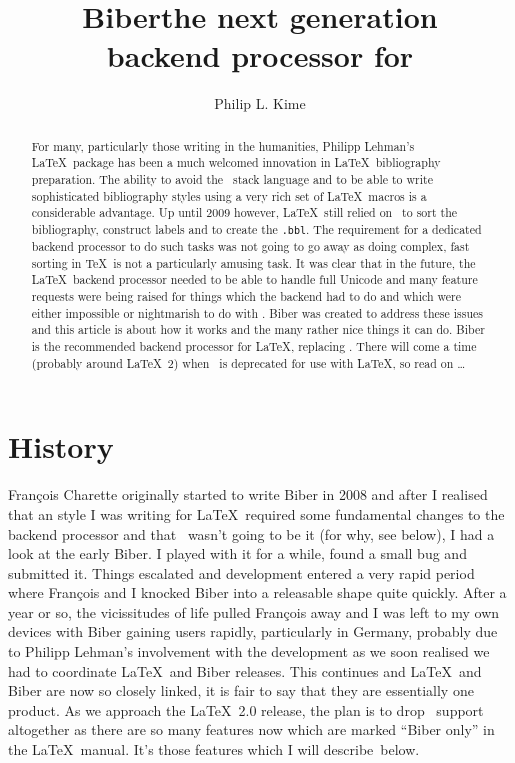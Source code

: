 \documentclass[final]{ltugboat}
\title{Biber\Dash{}the next generation \\backend processor for \BibLaTeX}
\author{Philip L. Kime}
\def\BibLaTeX{\Bib\LaTeX}
\begin{document}
\maketitle
\begin{abstract}
 For many, particularly those
 writing in the humanities, 
 Philipp Lehman's \BibLaTeX\ package has been a much welcomed
 innovation in \LaTeX\ bibliography
 preparation. The ability to avoid the \BibTeX\ stack language and to be
 able to write sophisticated bibliography styles using a very rich set of
 \LaTeX\ macros is a considerable advantage. Up until 2009 however,
 \BibLaTeX\ still relied on \BibTeX\ to sort the bibliography, construct labels and to
 create the \verb|.bbl|. The requirement for a dedicated backend processor
 to do such tasks was not going to go away as doing complex, fast sorting
 in \TeX\ is not a particularly amusing task. It was clear that in the
 future, the \BibLaTeX\ backend processor needed
 to be able to handle full Unicode and many feature requests were being
 raised for things which the backend had to do and which were
 either impossible or nightmarish to do with \BibTeX. Biber was created to
 address these issues and this article is about how it works and
 the many rather nice things it can do. Biber is the recommended backend
 processor for \BibLaTeX, replacing \BibTeX. There will come a time
 (probably around \BibLaTeX\ 2) when \BibTeX\ is deprecated for
 use with \BibLaTeX, so read on \ldots
\end{abstract}

\section{History}
Fran\c{c}ois Charette originally started to write Biber in 2008 and after I
realised that an  style I was writing for \BibLaTeX\ required some
fundamental changes to the backend processor and that \BibTeX\ wasn't going
to be it (for why, see below), I had a look at the early Biber. I played
with it for a while, found a small bug and submitted it. Things escalated
and development entered a very rapid period where Fran\c{c}ois and I knocked
Biber into a releasable shape quite quickly. After a year or so, the
vicissitudes of life pulled Fran\c{c}ois away and I was left
to my own devices with Biber gaining users rapidly, particularly in
Germany, probably due to Philipp Lehman's involvement with the development
as we soon realised we had to coordinate \BibLaTeX\ and Biber releases.
This continues and \BibLaTeX\ and Biber are now so closely linked, it is
fair to say that they are essentially one product. As we approach the
\BibLaTeX~2.0 release, the plan is to drop \BibTeX\ support altogether as
there are so many features now which are marked ``Biber only'' in the
\BibLaTeX\ manual. It's those features which I will describe~below.
\end{document}
